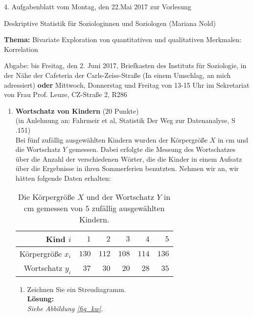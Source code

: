 \documentclass[11pt]{article}
\newcommand{\VORLESUNG}{Deskriptive Statistik für Soziologinnen und Soziologen}
\newcommand{\STAFF}{Mariana Nold}
\newcommand{\ASSIGNMENT}{4}
\newcommand{\HANDOUT}{Montag, den 22.Mai   2017}
\newcommand{\DELIVER}{bis Freitag, den 2. Juni 2017, Briefkasten des Instituts für Soziologie, in der Nähe der Cafeteria der Carls-Zeiss-Straße (In einem Umschlag, an mich adressiert) \textbf{oder} Mittwoch, Donnerstag und Freitag von 13-15 Uhr im Sekretariat von Frau Prof. Leuze, CZ-Straße 2, R286}
\newcommand{\PRACTICAL}[1]{\marginpar{\tiny {\bf Aufgabe \\ abgeben!} #1}}
\newcommand{\titel}{Bivariate Exploration von  quantitativen und qualitativen 
Merkmalen: Korrelation}
\newcommand{\startwert}{14}
\newcommand{\punkte}[1]{{\small{ }(#1 Punkte)}}
\newcommand{\aufgabe}[1]{\item{\bf #1}}
\begin{document}

\begin{center}
\ASSIGNMENT{}. Aufgabenblatt vom \HANDOUT{} zur Vorlesung 
\vspace*{0.5cm}

{\Large \VORLESUNG{}}
(\STAFF{}) 


\vspace*{0.5cm}
{\textbf{Thema:} \titel{}\\}
\vspace*{0.2cm}

{\small Abgabe: \DELIVER{}}
\vspace*{1cm}
\end{center}

\begin{enumerate}\addtocounter{enumi}{\startwert}




\aufgabe{Wortschatz von Kindern} \punkte{20} \PRACTICAL{}\\
(in Anlehnung an: Fahrmeir et al, Statistik Der Weg zur Datenanalyse, S .151)\\
Bei fünf zufällig ausgewählten Kindern wurden der Körpergröße  $X$  in cm und die 
Wortschatz $Y$  gemessen. Dabei erfolgte die Messung des Wortschatzes
über die Anzahl der verschiedenen Wörter, die die Kinder in einem Aufsatz über die 
Ergebnisse in ihren Sommerferien benutzten. Nehmen wir an,
wir hätten folgende Daten erhalten:

 \begin{table}[h]
 \centering 
\begin{tabular}{|r|r|r|r|r|r|}
  \hline
  Kind   $i$     &   $1$    & $2$   & $3$   & $4$   & $5$ \\ \hline
  Körpergröße  $x_{i}$ & $130$ & $112$ & $108$ & $114$ & $136$  \\ \hline
  Wortschatz  $y_{i}$ & $37$& $30$ & $20$&  $28$ & $35$ \\ \hline
  \end{tabular}
 \caption{Die Körpergröße  $X$ und der Wortschatz $Y$ in cm gemessen von $5$
 zufällig ausgewählten Kindern. \label{tab1}}
 \end{table}  
 
\begin{enumerate}
\item{Zeichnen Sie ein Streudiagramm.\\
\textbf{Lösung:}\\
\textit{Siehe Abbildung \ref{fig_kw}.}
} 


\end{enumerate}
\end{enumerate}
\end{document}
